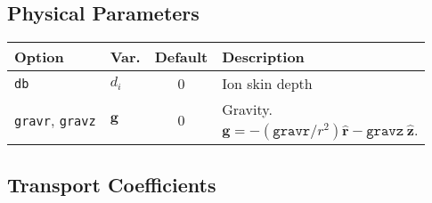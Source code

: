 \documentclass[letterpaper]{book}
\renewcommand{\vec}[1]{\ensuremath{\mathbf{#1}}}
\newcommand{\uvec}[1]{\ensuremath{\vec{\hat{#1}}}}
\begin{document}
\subsection{Physical Parameters}

\begin{tabular}{llcl}
  \textbf{Option}&\textbf{Var.}&\textbf{Default}&\textbf{Description}\\
  \hline
  \texttt{db}     & $d_i$   & 0   & Ion skin depth\\
  \texttt{gravr}, \texttt{gravz} & \vec{g} & 0 & \parbox[t]{1.8in}{Gravity.\\
                       $\vec{g} = -(\mathtt{gravr}/r^2) \uvec{r} 
                                  - \mathtt{gravz}\ \uvec{z}$.}
\end{tabular}


\subsection{Transport Coefficients}
\end{document}
